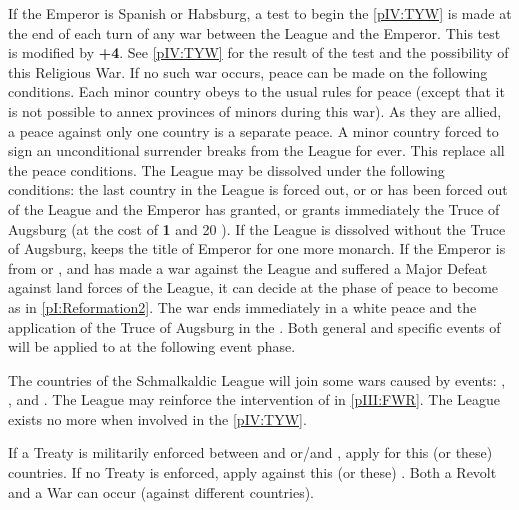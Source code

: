 \phpaix
\aparag If the Emperor is Spanish or Habsburg, a test to begin the
\ref{pIV:TYW} is made at the end of each turn of any war between the League
and the Emperor. This test is modified by {\bf +4}. See \ref{pIV:TYW} for the
result of the test and the possibility of this Religious War. If no such war
occurs, peace can be made on the following conditions.
\aparag Each minor country obeys to the usual rules for peace (except that it
is not possible to annex provinces of minors during this war). As they are
allied, a peace against only one country is a separate peace.
\aparag A minor country forced to sign an unconditional surrender breaks from
the League for ever. This replace all the peace conditions.
\aparag The League may be dissolved under the following conditions:
\bparag the last country in the League is forced out, or
\bparag \paysHesse or \paysSaxe has been forced out of the League and the
Emperor has granted, or grants immediately the Truce of Augsburg (at the cost
of {\bf 1} \STAB and 20 \PV).
\aparag If the League is dissolved without the Truce of Augsburg, \SPA keeps
the title of Emperor for one more monarch.
\bparag If the Emperor is from \SPA or \HAB, and has made a war against the
League and suffered a Major Defeat against land forces of the League, it can
decide at the phase of peace to become \CATHCO as in
\ref{pI:Reformation2}. The war ends immediately in a white peace and the
application of the Truce of Augsburg in the \HRE. Both general and specific
events of  will be applied to \SPA at the following
event phase.

\effetlong
\aparag The countries of the Schmalkaldic League will join some wars caused by
events: , , and . The League may reinforce the intervention of \paysPalatinat in
\ref{pIII:FWR}. The League exists no more when involved in the \ref{pIV:TYW}.





\condition{}
\aparag If a Treaty is militarily enforced between \POR and \paysOman or/and
\paysAden, apply  for this (or these)
countries.
\aparag If no Treaty is enforced, apply 
against this (or these) \MIN. Both a Revolt and a War can occur (against
different countries).



